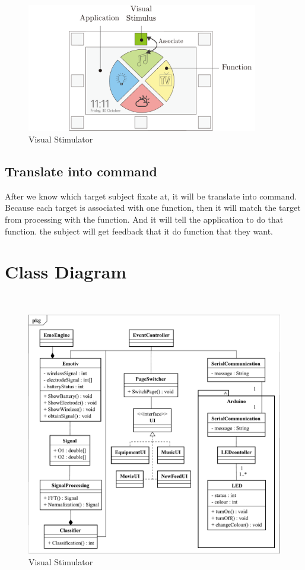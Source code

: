 \begin{figure}[ht]
	\centering
	\includegraphics[width=0.9\textwidth]{chapter5/associate.pdf}
	\caption{Visual Stimulator}
\end{figure}

\subsection{Translate into command}
\hspace{1.5cm} After we know which target subject fixate at, it will be translate into command. Because each target is associated with one function, then it will match the target from processing with the function. And it will tell the application to do that function. the subject will get feedback that it do function that they want.

\newpage
\section{Class Diagram}
\
\begin{figure}[ht]
	\centering
	\includegraphics[width=\textwidth]{chapter5/Class.pdf}
	\caption{Visual Stimulator}
\end{figure}

